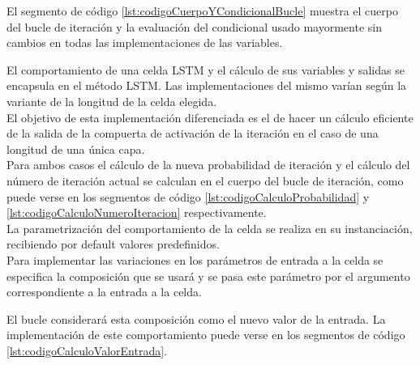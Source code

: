 \documentclass{article}
\begin{document}
El segmento de código \ref{lst:codigoCuerpoYCondicionalBucle} muestra el cuerpo del bucle de iteración y la evaluación del condicional usado mayormente sin cambios en todas las implementaciones de las variables.



El comportamiento de una celda LSTM y el cálculo de sus variables y salidas se encapsula en el método LSTM. Las implementaciones del mismo varían según la variante de la longitud de la celda elegida.\\

El objetivo de esta implementación diferenciada es el de hacer un cálculo eficiente de la salida de la compuerta de activación de la iteración en el caso de una longitud de una única capa.\\

Para ambos casos el cálculo de la nueva probabilidad de iteración y el cálculo del número de iteración actual se calculan en el cuerpo del bucle de iteración, como puede verse en los segmentos de código \ref{lst:codigoCalculoProbabilidad} y \ref{lst:codigoCalculoNumeroIteracion} respectivamente.\\





La parametrización del comportamiento de la celda se realiza en su instanciación, recibiendo por default valores predefinidos.\\

Para implementar las variaciones en los parámetros de entrada a la celda se especifica la composición que se usará y se pasa este parámetro por el argumento correspondiente a la entrada a la celda.

El bucle considerará esta composición como el nuevo valor de la entrada. La implementación de este comportamiento puede verse en los segmentos de código \ref{lst:codigoCalculoValorEntrada}.\\
\end{document}
